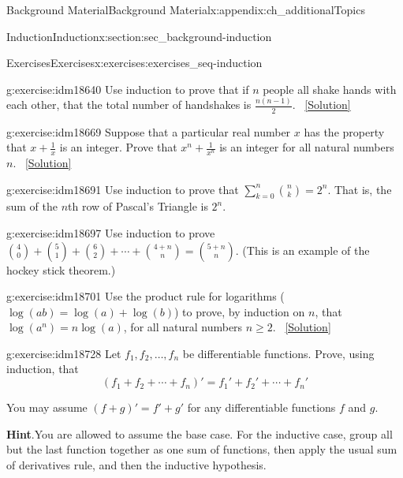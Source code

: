\documentclass[oneside,10pt,]{book}
\numberwithin{equation}{chapter}
\def\d{\displaystyle}
\begin{document}
\begin{appendixptx}{Background Material}{}{Background Material}{}{}{x:appendix:ch_additionalTopics}
\begin{sectionptx}{Induction}{}{Induction}{}{}{x:section:sec_background-induction}
\begin{exercises-subsection}{Exercises}{}{Exercises}{}{}{x:exercises:exercises_seq-induction}
\begin{divisionexercise}{17}{}{}{g:exercise:idm18640}%
Use induction to prove that if \(n\) people all shake hands with each other, that the total number of handshakes is \(\frac{n(n-1)}{2}\).%
\qquad~\hfill{\tiny\hyperlink{g:solution:idm18645-main}{[Solution]}}\end{divisionexercise}%
\begin{divisionexercise}{18}{}{}{g:exercise:idm18669}%
Suppose that a particular real number \(x\) has the property that \(x + \frac{1}{x}\) is an integer. Prove that \(x^n + \frac{1}{x^n}\) is an integer for all natural numbers \(n\).%
\qquad~\hfill{\tiny\hyperlink{g:solution:idm18676-main}{[Solution]}}\end{divisionexercise}%
\begin{divisionexercise}{19}{}{}{g:exercise:idm18691}%
Use induction to prove that \(\d\sum_{k=0}^n {n \choose k} = 2^n\). That is, the sum of the \(n\)th row of Pascal's Triangle is \(2^n\).%
\end{divisionexercise}%
\begin{divisionexercise}{20}{}{}{g:exercise:idm18697}%
Use induction to prove \({4 \choose 0} + {5 \choose 1} + {6 \choose 2} + \cdots + {4+n \choose n} = {5+n \choose n}\). (This is an example of the hockey stick theorem.)%
\end{divisionexercise}%
\begin{divisionexercise}{21}{}{}{g:exercise:idm18701}%
Use the product rule for logarithms (\(\log(ab) = \log(a) + \log(b)\)) to prove, by induction on \(n\), that \(\log(a^n) = n \log(a)\), for all natural numbers \(n \ge 2\).%
\qquad~\hfill{\tiny\hyperlink{g:solution:idm18708-main}{[Solution]}}\end{divisionexercise}%
\begin{divisionexercise}{22}{}{}{g:exercise:idm18728}%
Let \(f_1, f_2,\ldots, f_n\) be differentiable functions. Prove, using induction, that%
\begin{equation*}
(f_1 + f_2 + \cdots + f_n)' = f_1' + f_2' + \cdots + f_n'
\end{equation*}
%
\par
You may assume \((f+g)' = f' + g'\) for any differentiable functions \(f\) and \(g\).%
\par\smallskip%
\noindent\textbf{Hint}.\hypertarget{g:hint:idm18737}{}\quad{}You are allowed to assume the base case. For the inductive case, group all but the last function together as one sum of functions, then apply the usual sum of derivatives rule, and then the inductive hypothesis.%

\end{divisionexercise}
\end{exercises-subsection}
\end{sectionptx}
\end{appendixptx}
\end{document}
